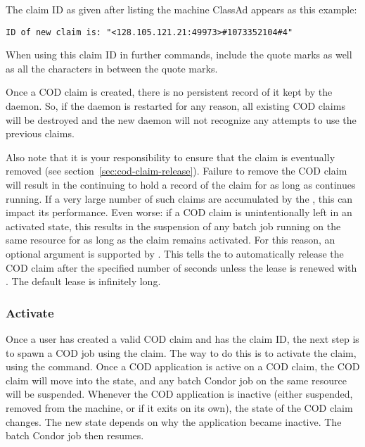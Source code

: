 The claim ID as given after listing the machine ClassAd appears as
this example:
\footnotesize
\begin{verbatim}
ID of new claim is: "<128.105.121.21:49973>#1073352104#4"
\end{verbatim}
\normalsize
When using this claim ID in further commands, include the quote
marks as well as all the characters in between the quote marks.

\Note Once a COD claim is created, there is no persistent record of it
kept by the  daemon.
So, if the  daemon is restarted for any reason, all existing
COD claims will be destroyed and the new  daemon will not
recognize any attempts to use the previous claims.

Also note that it is your responsibility to ensure that the claim is
eventually removed (see section~\ref{sec:cod-claim-release}).  Failure
to remove the COD claim will result in the  continuing
to hold a record of the claim for as long as  continues
running.  If a very large number of such claims are accumulated by the
, this can impact its performance.  Even worse: if a
COD claim is unintentionally left in an activated state, this results
in the suspension of any batch job running on the same resource for as
long as the claim remains activated.  For this reason, an optional
 argument is supported by .  This
tells the  to automatically release the COD claim after
the specified number of seconds unless the lease is renewed with
.  The default lease is infinitely long.


\subsubsection{\label{sec:cod-claim-activate}Activate}

Once a user has created a valid COD claim and has the claim ID, the
next step is to spawn a COD job using the claim.
The way to do this is to activate the claim, using the
 command.
Once a COD application is active on a COD claim, the COD claim will
move into the \verb@Running@ state, and any batch Condor job
on the same resource will be suspended.
Whenever the COD application is inactive (either suspended, removed
from the machine, or if it exits on its own), the state of the COD
claim changes. The new state depends on why the application
became inactive. 
The batch Condor job then resumes.

